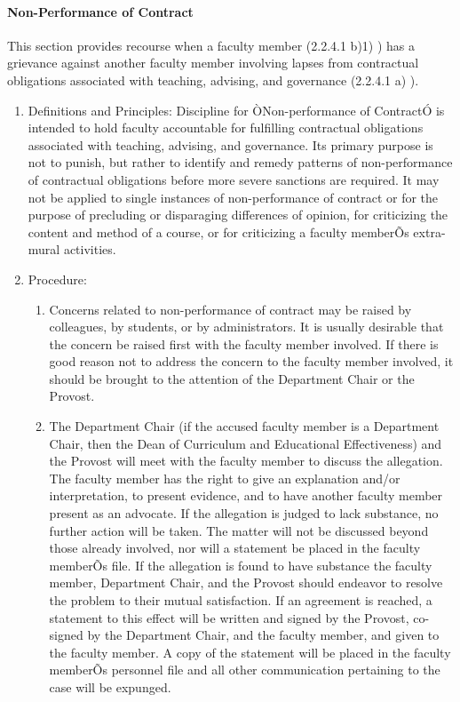 \documentclass[letterpaper, 11pt]{article}
\begin{document}
			\paragraph{Non-Performance of Contract}
				This section provides recourse when a faculty member (2.2.4.1 b)1) ) has a grievance against another faculty member involving lapses from contractual obligations associated with teaching, advising, and governance (2.2.4.1 a) ).
				\begin{enumerate}[label=\alph*)]
					\item{Definitions and Principles:}
					Discipline for ÒNon-performance of ContractÓ is intended to hold faculty accountable for fulfilling contractual obligations associated with teaching, advising, and governance.  Its primary purpose is not to punish, but rather to identify and remedy patterns of non-performance of contractual obligations before more severe sanctions are required.
					It may not be applied to single instances of non-performance of contract or for the purpose of precluding or disparaging differences of opinion, for criticizing the content and method of a course, or for criticizing a faculty memberÕs extra-mural activities.
					\item{Procedure:
						\begin{enumerate}[label=\arabic*)]
							\item{Concerns related to non-performance of contract may be raised by colleagues, by students, or by administrators.  It is usually desirable that the concern be raised first with the faculty member involved.  If there is good reason not to address the concern to the faculty member involved, it should be brought to the attention of the Department Chair or the Provost.}
							\item{The Department Chair (if the accused faculty member is a Department Chair, then the Dean of Curriculum and Educational Effectiveness) and the Provost will meet with the faculty member to discuss the allegation.  The faculty member has the right to give an explanation and/or interpretation, to present evidence, and to have another faculty member present as an advocate.  If the allegation is judged to lack substance, no further action will be taken.  The matter will not be discussed beyond those already involved, nor will a statement be placed in the faculty memberÕs file.  If the allegation is found to have substance the faculty member, Department Chair, and the Provost should endeavor to resolve the problem to their mutual satisfaction.  If an agreement is reached, a statement to this effect will be written and signed by the Provost, co-signed by the Department Chair, and the faculty member, and given to the faculty member.  A copy of the statement will be placed in the faculty memberÕs personnel file and all other communication pertaining to the case will be expunged.}

\end{enumerate}}
\end{enumerate}
\end{document}
